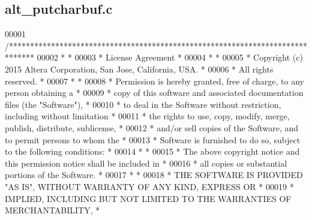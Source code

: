 \subsection{alt\+\_\+putcharbuf.\+c}
\label{alt__putcharbuf_8c_source}

\begin{DoxyCode}
00001 \textcolor{comment}{/******************************************************************************}
00002 \textcolor{comment}{*                                                                             *}
00003 \textcolor{comment}{* License Agreement                                                           *}
00004 \textcolor{comment}{*                                                                             *}
00005 \textcolor{comment}{* Copyright (c) 2015 Altera Corporation, San Jose, California, USA.           *}
00006 \textcolor{comment}{* All rights reserved.                                                        *}
00007 \textcolor{comment}{*                                                                             *}
00008 \textcolor{comment}{* Permission is hereby granted, free of charge, to any person obtaining a     *}
00009 \textcolor{comment}{* copy of this software and associated documentation files (the "Software"),  *}
00010 \textcolor{comment}{* to deal in the Software without restriction, including without limitation   *}
00011 \textcolor{comment}{* the rights to use, copy, modify, merge, publish, distribute, sublicense,    *}
00012 \textcolor{comment}{* and/or sell copies of the Software, and to permit persons to whom the       *}
00013 \textcolor{comment}{* Software is furnished to do so, subject to the following conditions:        *}
00014 \textcolor{comment}{*                                                                             *}
00015 \textcolor{comment}{* The above copyright notice and this permission notice shall be included in  *}
00016 \textcolor{comment}{* all copies or substantial portions of the Software.                         *}
00017 \textcolor{comment}{*                                                                             *}
00018 \textcolor{comment}{* THE SOFTWARE IS PROVIDED "AS IS", WITHOUT WARRANTY OF ANY KIND, EXPRESS OR  *}
00019 \textcolor{comment}{* IMPLIED, INCLUDING BUT NOT LIMITED TO THE WARRANTIES OF MERCHANTABILITY,    *}

\end{DoxyCode}
